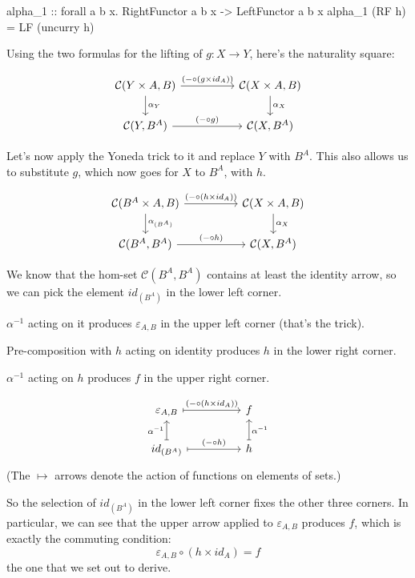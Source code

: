 \documentclass[DaoFP]{subfiles}
\begin{document}
\begin{haskell}
alpha_1 :: forall a b x. RightFunctor a b x -> LeftFunctor a b x
alpha_1 (RF h) = LF (uncurry h)
\end{haskell}

Using the two formulas for the lifting of $g \colon X \to Y$, here's the naturality square:

\[
 \begin{tikzcd}
 \mathcal{C}(Y \times A, B)
 \arrow[rr, "(- \circ (g \times id_A))"]
 \arrow[d,  "\alpha_Y"]
& &
\mathcal{C}(X \times A, B)
  \arrow[d, "\alpha_X"]
 \\
 \mathcal{C}(Y, B^A)
 \arrow[rr, "(- \circ g)"]
& &
\mathcal{C}(X, B^A)
 \end{tikzcd}
\]

Let's now apply the Yoneda trick to it and replace $Y$ with $B^A$. This also allows us to substitute $g$, which now goes for $X$ to $B^A$, with $h$. 

\[
 \begin{tikzcd}
 \mathcal{C}(B^A \times A, B)
 \arrow[rr, "(- \circ (h \times id_A))"]
 \arrow[d,  "\alpha_{(B^A)}"]
& &
\mathcal{C}(X \times A, B)
  \arrow[d,  "\alpha_X"]
 \\
 \mathcal{C}(B^A, B^A)
 \arrow[rr, "(- \circ h)"]
& &
\mathcal{C}(X, B^A)
 \end{tikzcd}
\]

We know that the hom-set $\mathcal{C}(B^A, B^A)$ contains at least the identity arrow, so we can pick the element $id_{(B^A)}$ in the lower left corner. 

$\alpha^{-1}$ acting on it produces $\varepsilon_{A, B}$ in the upper left corner (that's the  trick). 

Pre-composition with $h$ acting on identity produces $h$ in the lower right corner. 

$\alpha^{-1}$ acting on $h$ produces $f$ in the upper right corner. 

\[
 \begin{tikzcd}[
  every arrow/.style={draw,mapsto}
]
 \varepsilon_{A, B}
 \arrow[rr, "(- \circ (h \times id_A))"]
& &
f
 \\
 id_{(B^A)}
 \arrow[u, "\alpha^{-1}"]
 \arrow[rr, "(- \circ h)"]
& &
h
\arrow[u, "\alpha^{-1}"']
 \end{tikzcd}
\]
(The $\mapsto$ arrows denote the action of functions on elements of sets.)


So the selection of $id_{(B^A)}$ in the lower left corner fixes the other three corners. In particular, we can see that the upper arrow applied to $\varepsilon_{A, B}$ produces $f$, which is exactly the commuting condition:
\[ \varepsilon_{A, B} \circ (h \times id_A) = f \]
the one that we set out to derive.
\end{document}
